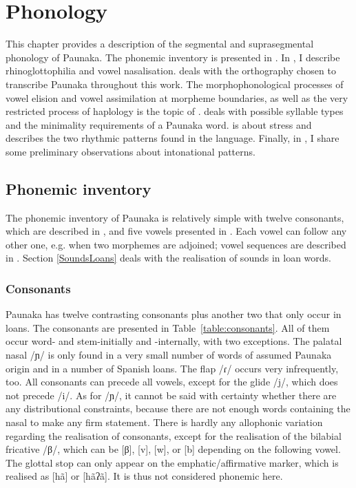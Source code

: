 
\chapter{Phonology}\label{chap:Phonology}

\TabPositions{1cm,2cm,3cm,4cm,5cm,6cm,7cm,8cm,9cm}
This chapter provides a description of the segmental and suprasegmental phonology of Paunaka. The phonemic inventory is presented in . In , I describe rhinoglottophilia and vowel nasalisation.  deals with the orthography chosen to transcribe Paunaka throughout this work. 
The morphophonological processes of vowel elision and vowel assimilation at morpheme boundaries, as well as the very restricted process of haplology is the topic of .  deals with possible syllable types and the minimality requirements of a Paunaka word.  is about stress and describes the two rhythmic patterns found in the language. Finally, in , I share some preliminary observations about intonational patterns.


\section{Phonemic inventory} \label{sec:PhonemicInventory}
The phonemic inventory of Paunaka is relatively simple with twelve consonants, which are described in , and five vowels presented in . Each vowel can follow any other one, e.g. when two morphemes are adjoined; vowel sequences are described in . Section \ref{SoundsLoans} deals with the realisation of sounds in loan words.


\subsection{Consonants}
\label{Consonants}
Paunaka has twelve contrasting consonants plus another two that only occur in loans. The consonants are presented in Table~\ref{table:consonants}. All of them occur word- and stem-initially and -internally, with two exceptions. The palatal nasal /ɲ/ is only found in a very small number of words of assumed Paunaka origin and in a number of Spanish loans. The flap /ɾ/ occurs very infrequently, too. All consonants can precede all vowels, except for the glide /j/, which does not precede /i/. As for /ɲ/, it cannot be said with certainty whether there are any distributional constraints, because there are not enough words containing the nasal to make any firm statement. There is hardly any allophonic variation regarding the realisation of consonants, except for the realisation of the bilabial fricative /β/, which can be [β], [v], [w], or [b] depending on the following vowel. The glottal stop can only appear on the emphatic/affirmative marker, which is realised as [hã] or [hãʔã]. It is thus not considered phonemic here.

